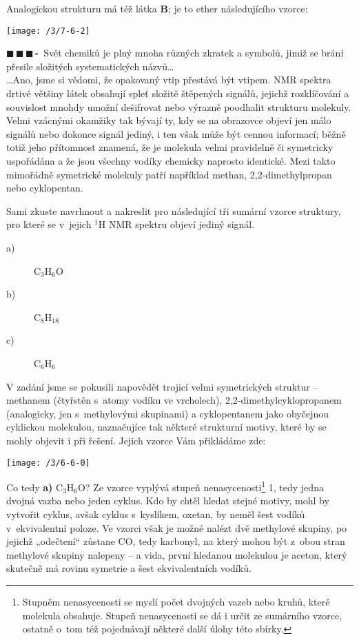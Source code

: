 \documentclass{book}
\newcommand{\tri}{$\blacksquare \, \blacksquare \, \blacksquare \, \square \; \; $}
\renewenvironment{quotation}{\par}{\par} %
\begin{document}
Analogickou strukturu má též látka \textbf{B}; je to ether následujícího vzorce:
\begin{center}
\texttt{[image: /3/7-6-2]}
\end{center}

\hrulefill %
\begin{quotation}
\tri Svět chemiků je plný mnoha různých zkratek a symbolů, jimiž se brání
přesile složitých systematických názvů\ldots\\ 
\ldots\-Ano, jsme si vědomi, že opakovaný vtip přestává být vtipem.
NMR spektra drtivé většiny látek obsahují spleť
složitě štěpených signálů, jejichž rozklíčování a souvislost mnohdy
umožní dešifrovat nebo výrazně poodhalit strukturu molekuly. Velmi
vzácnými okamžiky tak bývají ty, kdy se na obrazovce objeví jen málo
signálů nebo dokonce signál jediný, i ten však může být cennou informací;
běžně totiž jeho přítomnost znamená, že je molekula velmi pravidelně
či symetricky uspořádána a že jsou všechny vodíky chemicky naprosto
identické. Mezi takto mimořádně symetrické molekuly patří například
methan, 2,2-dimethylpropan nebo cyklopentan. 

Sami zkuste navrhnout a nakreslit pro následující tři sumární vzorce
struktury, pro které se v~jejich $^{1}$H NMR spektru objeví jediný
signál. 
\begin{description}
\item [{a)}] C$_{3}$H$_{6}$O 
\item [{b)}] C$_{8}$H$_{18}$ 
\item [{c)}] C$_{6}$H$_{6}$
\end{description}
\end{quotation} \dotfill \par 
V zadání jsme se pokusili napovědět trojicí
velmi symetrických struktur -- methanem (čtyřstěn s~atomy vodíku
ve vrcholech), 2,2-dimethylcyklopropanem (analogicky, jen s~methylovými
skupinami) a cyklopentanem jako obyčejnou cyklickou molekulou, naznačujíce
tak některé strukturní motivy, které by se mohly objevit i při řešení. Jejich vzorce Vám přikládáme zde:

\begin{center}
\texttt{[image: /3/6-6-0]}
\end{center}

Co tedy \textbf{a)} C$_{3}$H$_{6}$O? Ze vzorce vyplývá stupeň nenasycenosti\footnote{Stupněm nenasycenosti se myslí počet dvojných vazeb nebo kruhů, které molekula obsahuje. Stupeň nenasycenosti se dá i určit ze sumárního vzorce, ostatně o~tom též pojednávají některé další úlohy této sbírky.} 1, tedy
jedna dvojná vazba nebo jeden cyklus. Kdo by chtěl hledat stejné motivy,
mohl by vytvořit cyklus, avšak cyklus s~kyslíkem, oxetan, by neměl
šest vodíků v~ekvivalentní poloze. Ve vzorci však je možné nalézt
dvě methylové skupiny, po jejichž „odečtení“ zůstane CO, tedy karbonyl,
na který mohou být z~obou stran methylové skupiny nalepeny -- a vida,
první hledanou molekulou je aceton, který skutečně má rovinu symetrie
a šest ekvivalentních vodíků. 
\end{document}
